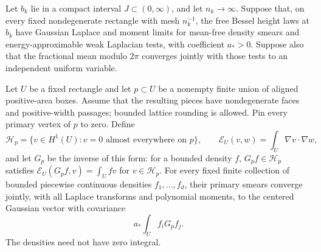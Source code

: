 \begin{lemma}\label{lem:profile-pins}
Let \(b_k\) lie in a compact interval \(J\subset(0,\infty)\), and let
\(n_k\to\infty\).  Suppose that, on every fixed nondegenerate rectangle
with mesh \(n_k^{-1}\), the free Bessel height laws at \(b_k\) have
Gaussian Laplace and moment limits for mean-free density smears and
energy-approximable weak Laplacian tests, with coefficient \(a_*>0\).
Suppose also that the fractional mean modulo \(2\pi\) converges jointly
with those tests to an independent uniform variable.

Let \(U\) be a fixed rectangle and let \(p\subset U\) be a nonempty
finite union of aligned positive-area boxes.  Assume that the resulting
pieces have nondegenerate faces and positive-width passages; bounded
lattice rounding is allowed.  Pin every primary vertex of \(p\) to zero.
Define
\[
 \mathcal H_p=\{v\in H^1(U):v=0\text{ almost everywhere on }p\},
 \qquad \mathcal E_U(v,w)=\int_U\nabla v\cdot\nabla w,
\]
and let \(G_p\) be the inverse of this form: for a bounded density \(f\),
\(G_pf\in\mathcal H_p\) satisfies
\(\mathcal E_U(G_pf,v)=\int_Ufv\) for \(v\in\mathcal H_p\).
For every fixed finite collection of bounded piecewise continuous
densities \(f_1,\ldots,f_d\), their primary smears converge jointly,
with all Laplace transforms and polynomial moments, to the centered
Gaussian vector with covariance
\begin{equation}\label{eq:profile-pinned-covariance}
                  a_*\int_U f_iG_pf_j.
\end{equation}
The densities need not have zero integral.
\end{lemma}

